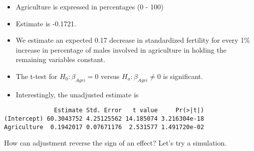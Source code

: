 \documentclass[12pt,]{04-class-files/abntex2}
\newenvironment{Shaded}{\begin{snugshade}}{\end{snugshade}}
\newcommand{\DataTypeTok}[1]{\textcolor[rgb]{0.13,0.29,0.53}{#1}}
\newcommand{\DecValTok}[1]{\textcolor[rgb]{0.00,0.00,0.81}{#1}}
\newcommand{\FloatTok}[1]{\textcolor[rgb]{0.00,0.00,0.81}{#1}}
\newcommand{\KeywordTok}[1]{\textcolor[rgb]{0.13,0.29,0.53}{\textbf{#1}}}
\newcommand{\NormalTok}[1]{#1}
\newcommand{\OperatorTok}[1]{\textcolor[rgb]{0.81,0.36,0.00}{\textbf{#1}}}
\newcommand{\StringTok}[1]{\textcolor[rgb]{0.31,0.60,0.02}{#1}}
\providecommand{\tightlist}{%
  \setlength{\itemsep}{0pt}\setlength{\parskip}{0pt}}
\begin{document}
\begin{itemize}
\tightlist
\item
  Agriculture is expressed in percentages (0 - 100)
\item
  Estimate is -0.1721.
\item
  We estimate an expected 0.17 decrease in standardized fertility for every 1\% increase in percentage of males involved in agriculture in holding the remaining variables constant.
\item
  The t-test for \(H_0: \beta_{Agri} = 0\) versus \(H_a: \beta_{Agri} \neq 0\) is significant.
\item
  Interestingly, the unadjusted estimate is
\end{itemize}

\begin{Shaded}
\end{Shaded}

\begin{verbatim}
              Estimate Std. Error   t value     Pr(>|t|)
(Intercept) 60.3043752 4.25125562 14.185074 3.216304e-18
Agriculture  0.1942017 0.07671176  2.531577 1.491720e-02
\end{verbatim}

How can adjustment reverse the sign of an effect? Let's try a simulation.

\begin{Shaded}
\end{Shaded}
\end{document}
